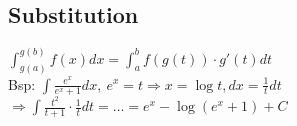     \subsection{Substitution}
    
    $\int_{g(a)}^{g(b)} f(x) dx = \int_a^b f(g(t)) \cdot g'(t) dt$ \\
    Bsp: $\int \frac{e^x}{e^x+1} dx, \: e^x = t \Longrightarrow x = \log t, dx = \frac{1}{t} dt$ \\
    $\Longrightarrow \int \frac{t^2}{t + 1} \cdot \frac{1}{t} dt = \dots = e^x - \log(e^x+1)+C$ \\

\vfill
